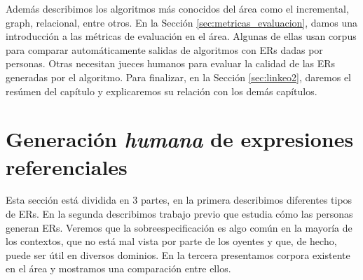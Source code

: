 Adem\'as describimos  los algoritmos m\'as conocidos del \'area como el incremental, graph, relacional, entre otros. 
En la Secci\'on \ref{sec:metricas_evaluacion}, damos una introducci\'on a las m\'etricas de evaluaci\'on en el \'area. Algunas de ellas usan corpus para comparar autom\'aticamente salidas de algoritmos con ERs dadas por personas. Otras necesitan jueces humanos para evaluar la calidad de las ERs generadas por el algoritmo. Para finalizar, en la Secci\'on \ref{sec:linkeo2}, daremos el res\'umen del cap\'itulo y explicaremos su relaci\'on con los dem\'as cap\'itulos.


\section{Generaci\'on \emph{humana} de expresiones referenciales}
\label{generacion-humana}

Esta secci\'on est\'a dividida en 3 partes, en la primera describimos diferentes tipos de ERs. En la segunda describimos trabajo previo que estudia c\'omo las personas generan ERs. Veremos que la sobreespecificaci\'on es algo com\'un en la mayor\'ia de los contextos, que no est\'a mal vista por parte de los oyentes y que, de hecho, puede ser \'util en diversos dominios. En la tercera presentamos corpora existente en el \'area y mostramos una comparaci\'on entre ellos.


